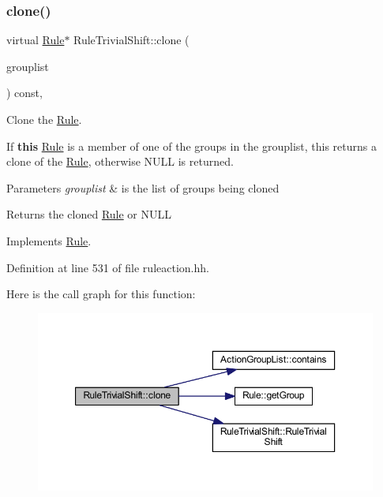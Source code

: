 \subsubsection{\texorpdfstring{clone()}{clone()}}
{\footnotesize\ttfamily virtual \mbox{\hyperlink{class_rule}{Rule}}$\ast$ Rule\+Trivial\+Shift\+::clone (\begin{DoxyParamCaption}\item[{const \mbox{\hyperlink{class_action_group_list}{Action\+Group\+List}} \&}]{grouplist }\end{DoxyParamCaption}) const\hspace{0.3cm}{\ttfamily [inline]}, {\ttfamily [virtual]}}



Clone the \mbox{\hyperlink{class_rule}{Rule}}. 

If {\bfseries{this}} \mbox{\hyperlink{class_rule}{Rule}} is a member of one of the groups in the grouplist, this returns a clone of the \mbox{\hyperlink{class_rule}{Rule}}, otherwise N\+U\+LL is returned. 
\begin{DoxyParams}{Parameters}
{\em grouplist} & is the list of groups being cloned \\
\hline
\end{DoxyParams}
\begin{DoxyReturn}{Returns}
the cloned \mbox{\hyperlink{class_rule}{Rule}} or N\+U\+LL 
\end{DoxyReturn}


Implements \mbox{\hyperlink{class_rule_a70de90a76461bfa7ea0b575ce3c11e4d}{Rule}}.



Definition at line 531 of file ruleaction.\+hh.

Here is the call graph for this function\+:
\nopagebreak
\begin{figure}[H]
\begin{center}
\leavevmode
\includegraphics[width=350pt]{class_rule_trivial_shift_a9a7e9aacdba678db987601eb1c633662_cgraph}
\end{center}
\end{figure}
\mbox{\label{class_rule_trivial_shift_a0d7693f3e4139a4a712a592c2ab9f684}} 
